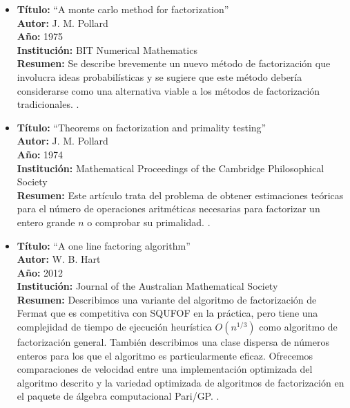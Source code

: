         \begin{itemize}
            \item \textbf{Título:} ``A monte carlo method for factorization'' \\
            \textbf{Autor:} J. M. Pollard \\
            \textbf{Año:} 1975 \\
            \textbf{Institución:} BIT Numerical Mathematics \\
            \textbf{Resumen:} Se describe brevemente un nuevo método de factorización que involucra ideas probabilísticas y se sugiere que este método debería considerarse como una alternativa viable a los métodos de factorización tradicionales. \citep{Pollard1975}.
        
            \item \textbf{Título:} ``Theorems on factorization and primality testing'' \\
            \textbf{Autor:} J. M. Pollard \\
            \textbf{Año:} 1974 \\
            \textbf{Institución:} Mathematical Proceedings of the Cambridge Philosophical Society \\
            \textbf{Resumen:} Este artículo trata del problema de obtener estimaciones teóricas para el número de operaciones aritméticas necesarias para factorizar un entero grande $n$ o comprobar su primalidad. \citep{Pollard1974}.
        
            \item \textbf{Título:} ``A one line factoring algorithm'' \\
            \textbf{Autor:} W. B. Hart \\
            \textbf{Año:} 2012 \\
            \textbf{Institución:} Journal of the Australian Mathematical Society \\
            \textbf{Resumen:} Describimos una variante del algoritmo de factorización de Fermat que es competitiva con SQUFOF en la práctica, pero tiene una complejidad de tiempo de ejecución heurística $O(n^{1/3})$ como algoritmo de factorización general. También describimos una clase dispersa de números enteros para los que el algoritmo es particularmente eficaz. Ofrecemos comparaciones de velocidad entre una implementación optimizada del algoritmo descrito y la variedad optimizada de algoritmos de factorización en el paquete de álgebra computacional Pari/GP. \citep{Hart2012}.


\end{itemize}
